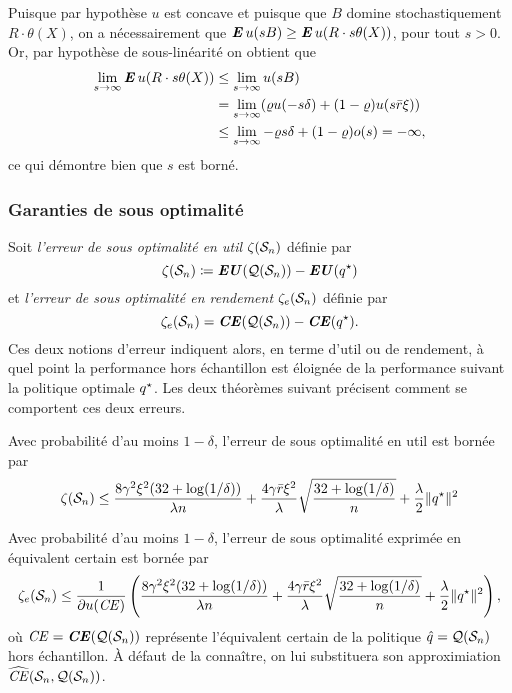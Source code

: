 Puisque par hypothèse $u$ est concave et puisque que $B$ domine stochastiquement
$R\cdot \theta(X)$, on a nécessairement que $\E u(sB) \geq \E u(R\cdot s\theta(X))$, pour tout
$s > 0$. Or, par hypothèse de sous-linéarité on obtient que
\begin{align}
  \lim_{s\to\infty}\E u(R\cdot s\theta(X)) &\leq \lim_{s\to\infty}u(sB)\\
                           & = \lim_{s\to\infty}(\varrho u(-s\delta) + (1-\varrho)u(s\rmax\xi))\\
                           & \leq\lim_{s\to\infty}-\varrho s \delta + (1-\varrho)o(s) = -\infty,
\end{align}
ce qui démontre bien que $s$ est borné.

\subsubsection{Garanties de sous optimalité}

Soit \textit{l'erreur de sous optimalité en util} $\zeta(\S_n)$ définie par
\begin{equation}
  \zeta(\S_n) \coloneq \EU(\alg(\S_n)) - \EU(\qs)
\end{equation}
et \textit{l'erreur de sous optimalité en rendement} $\zeta_e(\S_n)$ définie par
\begin{equation}
  \zeta_e(\S_n) = \CE(\alg(\S_n)) - \CE(\qs).
\end{equation}
Ces deux notions d'erreur indiquent alors, en terme d'util ou de rendement, à quel point
la performance hors échantillon est éloignée de la performance suivant la politique
optimale $\qs$. Les deux théorèmes suivant précisent comment se comportent ces deux
erreurs.
\begin{thm}
  \label{thm3}
  Avec probabilité d'au moins $1-\delta$, l'erreur de sous optimalité en util est bornée par
  \begin{equation}
    \zeta(\S_n) \leq \frac{8\gamma^2\xi^2(32+\log(1/\delta))}{\lambda n} +
    \frac{4\gamma\rmax\xi^2}{\lambda}\sqrt\frac{32+\log(1/\delta)}{n} + \frac{\lambda}{2}\|\qs\|^2 
  \end{equation}
\end{thm}

\begin{thm}
  \label{thm4}
  Avec probabilité d'au moins $1-\delta$, l'erreur de sous optimalité exprimée en équivalent
  certain est bornée par
  \begin{equation}
    \zeta_e(\S_n) \leq \frac{1}{\partial u(\nCE)}\left( \frac{8\gamma^2\xi^2(32+\log(1/\delta))}{\lambda n} +
      \frac{4\gamma\rmax\xi^2}{\lambda}\sqrt\frac{32+\log(1/\delta)}{n} + \frac{\lambda}{2}\|\qs\|^2 \right),
  \end{equation}
où $\nCE = \CE(\alg(\S_n))$ représente l'équivalent certain de la politique $\qh =
\alg(\S_n)$ hors échantillon. À défaut de la connaître, on lui substituera son
approximiation $\nhCE(\S_n,\alg(\S_n))$. 
\end{thm}


